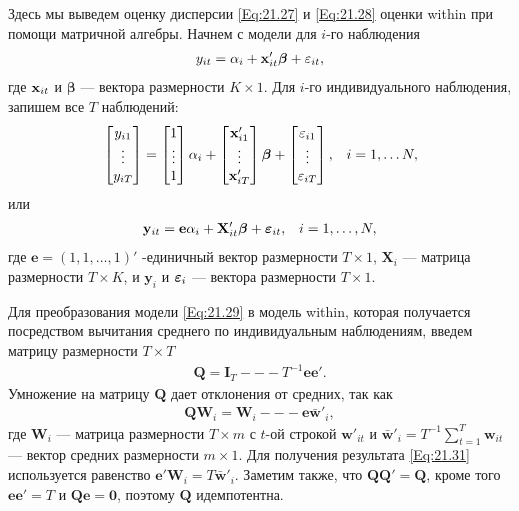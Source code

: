 Здесь мы  выведем оценку дисперсии \ref{Eq:21.27} и \ref{Eq:21.28} оценки within при помощи матричной алгебры. Начнем с модели для $i$-го наблюдения
\begin{align}
y_{it}=\alpha_i+\mathbf{x}'_{it}\bm\beta+\varepsilon_{it},
\nonumber
\end{align}
где $\mathbf{x}_{it}$ и $\bm\beta$ --- вектора размерности $K \times 1$. Для $i$-го индивидуального наблюдения, запишем все $T$ наблюдений:
\begin{align}
&\begin{bmatrix}
 y_{i1} \\
 \vdots \\
 y_{iT}
\end{bmatrix}
=
\begin{bmatrix}
1 \\ \vdots  \\ 1
\end{bmatrix}
\alpha_i + 
\begin{bmatrix}
\mathbf{x}'_{i1} \\ \vdots \\  \mathbf{x}'_{iT} 
\end{bmatrix}
 \bm\beta + 
\begin{bmatrix}
 \varepsilon_{i1} \\ \vdots \\ \varepsilon_{iT} 
\end{bmatrix}
, & i=1, \dots N,
\nonumber
\end{align}
или
\begin{align}
& \mathbf y_{it}=\mathbf e \alpha_i+\mathbf X'_{it}\bm\beta+\bm{\varepsilon}_{it},
& i=1, \dots, N,
\label{Eq:21.29}
\end{align}
где $\mathbf e=(1,1, \dots, 1)'$  -единичный  вектор размерности $T \times 1$, $\mathbf X_i$  --- матрица размерности $T \times K$, и $\mathbf y_i$ и $\bm{\varepsilon}_i$ --- вектора размерности $T \times 1$.

Для преобразования модели \ref{Eq:21.29} в модель within, которая получается посредством вычитания среднего по индивидуальным наблюдениям, введем матрицу размерности $T \times T$
\begin{align}
\mathbf Q=\mathbf I_T --- T^{-1} \mathbf e \mathbf e'.
\label{Eq:21.30}
\end{align}
Умножение на матрицу $\mathbf Q$ дает отклонения от средних, так как
\begin{align}
\mathbf Q \mathbf W_i= \mathbf  W_i --- \mathbf e \bar{\mathbf w}'_i,
\label{Eq:21.31}
\end{align}
где $\mathbf W_i$ --- матрица размерности $T \times m$ с $t$-ой строкой $\mathbf w'_{it}$ и $\bar{\mathbf w}'_i=T^{-1} \sum^T_{t=1} \mathbf w_{it}$ --- вектор средних размерности $m \times 1$. Для получения результата \ref{Eq:21.31} используется равенство $\mathbf e' \mathbf W_i=T\bar{\mathbf w}'_i$. Заметим также, что $\mathbf Q\mathbf Q'=\mathbf Q$, кроме того $\mathbf e \mathbf e'=T$ и $\mathbf Q \mathbf e =\mathbf 0$,  поэтому $\mathbf Q$ идемпотентна.

